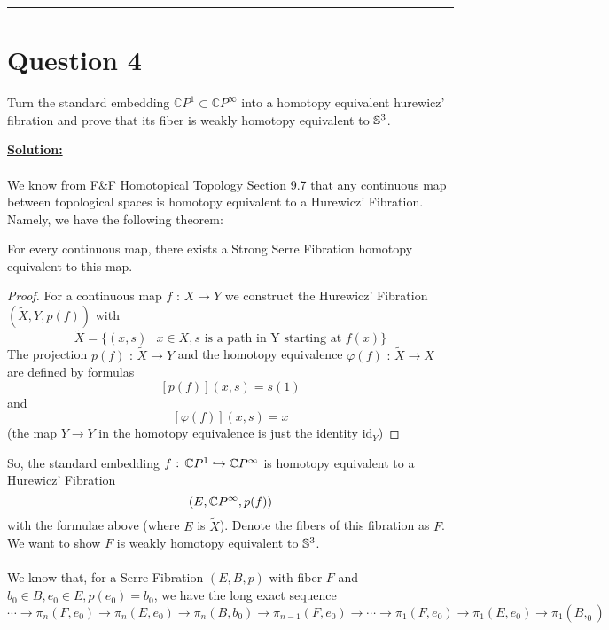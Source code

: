 \documentclass[11pt]{article}
\begin{document}
\vskip 0.5cm
\hrule
\pagebreak



\section{Question 4}
\begin{bluebox}
  Turn the standard embedding $\mathbb{C}P^1 \subset \mathbb{C}P^{\infty}$ into a homotopy equivalent hurewicz' fibration and prove that its fiber is weakly homotopy equivalent to $\mathbb{S}^3$.
\end{bluebox}

\vskip 0.5cm
\textbf{\underline{Solution:}}
\\
\\
We know from F\&F Homotopical Topology Section 9.7 that any continuous map between topological spaces is homotopy equivalent to a Hurewicz' Fibration. Namely, we have the following theorem:

\begin{dottedbox}

  \begin{redbox}
    \begin{theorem}
      For every continuous map, there exists a Strong Serre Fibration homotopy equivalent to this map.
    \end{theorem}
    \end{redbox}
    
    \begin{proof}
      For a continuous map $f \text{ : } X \rightarrow Y$ we construct the Hurewicz' Fibration $(\tilde{X}, Y, p(f))$ with $$\tilde{X} = \{ (x,s) ~|~ x \in X, s \text{ is a path in Y starting at } f(x) \}$$ The projection $p(f) \text{ : } \tilde{X} \rightarrow Y$ and the homotopy equivalence $\varphi(f) \text{ : } \tilde{X} \rightarrow X$ are defined by formulas
      $$ [p(f)](x, s) = s(1) $$ and $$ [\varphi(f)](x, s) = x$$ (the map $Y \rightarrow Y$ in the homotopy equivalence is just the identity $\mathrm{id}_Y$)
    \end{proof}
\end{dottedbox}

\vskip 0.25cm
So, the standard embedding $f \text{ : }\mathbb{C}P^1 \hookrightarrow \mathbb{C} P^{\infty}$ is homotopy equivalent to a Hurewicz' Fibration $$ (E, \mathbb{C} P^{\infty}, p(f)) $$ with the formulae above (where $E$ is $\tilde{X}$). Denote the fibers of this fibration as $F$. We want to show $F$ is weakly homotopy equivalent to $\mathbb{S}^3$.
\\
\\
We know that, for a Serre Fibration $(E, B, p)$ with fiber $F$ and $b_0 \in B, e_0 \in E, p(e_0) = b_0$, we have the long exact sequence $$ \cdots \rightarrow \pi_n(F, e_0) \rightarrow \pi_n(E, e_0) \rightarrow \pi_n(B, b_0) \rightarrow \pi_{n-1}(F, e_0) \rightarrow \cdots \rightarrow \pi_1(F, e_0) \rightarrow \pi_1(E, e_0) \rightarrow \pi_1(B, _0) $$
\end{document}
